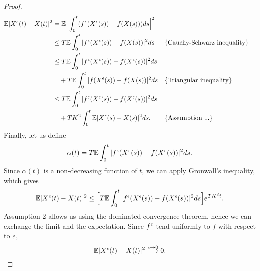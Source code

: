 \begin{proof}
\begin{equation*}
\begin{aligned}
	\mathbb{E} |X^\epsilon(t) - X(t)|^2  &= \mathbb{E} \Big|\int_0^t (f^\epsilon (X^\epsilon(s)) - f(X(s)))ds \Big|^2 \\
	&\leq T \mathbb{E} \int_0^t |f^\epsilon (X^\epsilon(s)) - f(X(s))|^2 ds   && \{\text{Cauchy-Schwarz inequality}\}\\
	&\leq T \mathbb{E} \int_0^t |f^\epsilon (X^\epsilon(s)) - f(X^\epsilon(s))|^2 ds \\
	&\quad + T \mathbb{E} \int_0^t |f (X^\epsilon(s)) - f(X(s))|^2 ds && \{\text{Triangular inequality}\} \\
	&\leq T \mathbb{E} \int_0^t |f^\epsilon (X^\epsilon(s)) - f(X^\epsilon(s))|^2 ds \\
	&\quad + TK^2 \int_0^t \mathbb{E}|X^\epsilon(s) - X(s)|^2ds. && \{\text{Assumption 1.}\} 
\end{aligned} 
\end{equation*}
Finally, let us define 
\begin{equation*}
	\alpha(t) = T \mathbb{E} \int_0^t |f^\epsilon (X^\epsilon(s)) - f(X^\epsilon(s))|^2 ds.
\end{equation*}
Since $\alpha(t)$ is a non-decreasing function of $t$, we can apply Gronwall's inequality, which gives 
\begin{equation*}
	\mathbb{E} |X^\epsilon(t) - X(t)|^2 \leq  \Big[ T \mathbb{E} \int_0^t |f^\epsilon (X^\epsilon(s)) - f(X^\epsilon(s))|^2 ds \Big] e^{TK^2t}.
\end{equation*}
Assumption 2 allows us using the dominated convergence theorem, hence we can exchange the limit and the expectation. Since $f^\epsilon$ tend uniformly to $f$ with respect to $\epsilon$, 
\begin{equation*}
	\mathbb{E} |X^\epsilon(t) - X(t)|^2 \stackrel{\epsilon \rightarrow 0}\longrightarrow 0.
\end{equation*}
\end{proof}
